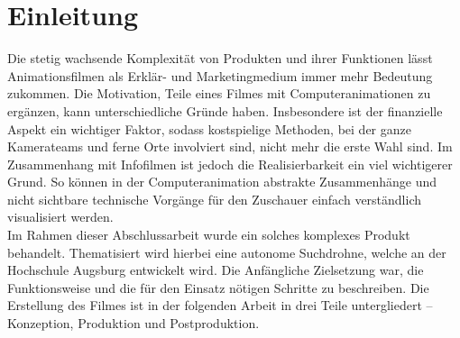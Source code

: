 
\chapter{Einleitung}

Die stetig wachsende Komplexität von Produkten und ihrer Funktionen lässt Animationsfilmen als Erklär- und Marketingmedium immer mehr Bedeutung zukommen. Die Motivation, Teile eines Filmes mit Computeranimationen zu ergänzen, kann unterschiedliche Gründe haben. 
Insbesondere ist der finanzielle Aspekt ein wichtiger Faktor, sodass kostspielige Methoden, bei der ganze Kamerateams und ferne Orte involviert sind, nicht mehr die erste Wahl sind.
Im Zusammenhang mit Infofilmen ist jedoch die Realisierbarkeit ein viel wichtigerer Grund. So können in der Computeranimation abstrakte Zusammenhänge und nicht sichtbare technische Vorgänge für den Zuschauer einfach verständlich visualisiert werden.\\
Im Rahmen dieser Abschlussarbeit wurde ein solches komplexes Produkt behandelt. Thematisiert wird hierbei eine autonome Suchdrohne, welche an der Hochschule Augsburg entwickelt wird. 
Die Anfängliche Zielsetzung war, die Funktionsweise und die für den Einsatz nötigen Schritte zu beschreiben.
Die Erstellung des Filmes ist in der folgenden Arbeit in drei Teile untergliedert -- Konzeption, Produktion und Postproduktion.